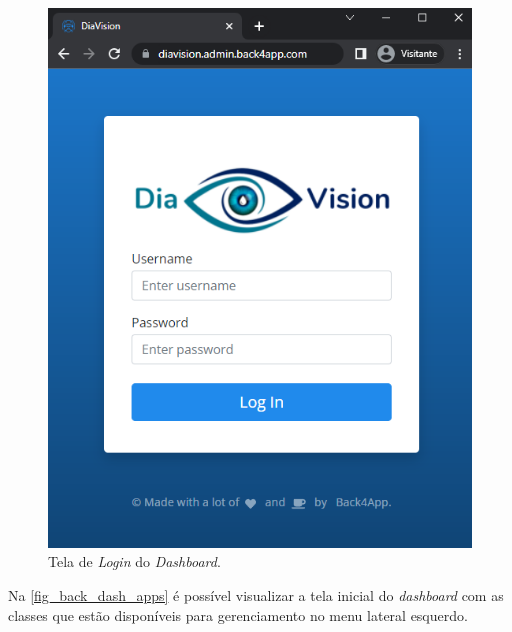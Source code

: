 \begin{figure}[htb]
    \caption{\label{fig_back_dash_auth}Tela de \emph{Login} do \emph{Dashboard}.}
    \begin{center}
        \includegraphics[scale=0.65]{Imagens/desenvolvimento/auth_admin.png}
    \end{center}
\end{figure}

\newpage

Na \autoref{fig_back_dash_apps} é possível visualizar a tela inicial do \emph{dashboard} com as classes
que estão disponíveis para gerenciamento no menu lateral esquerdo.

